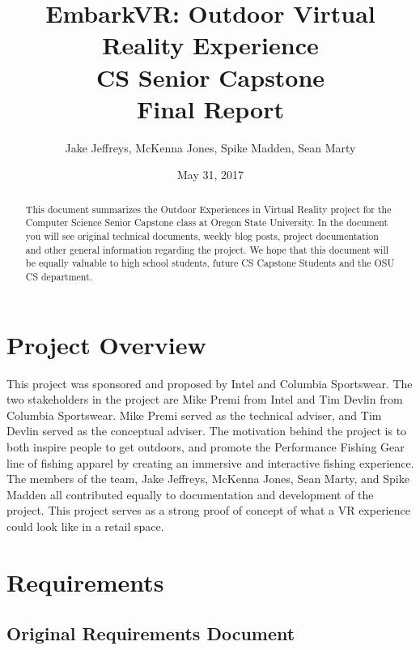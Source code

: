 \documentclass[10pt,journal,compsoc,onecolumn, draftclsnofoot]{IEEEtran}
\title{
EmbarkVR: Outdoor Virtual Reality Experience \\
CS Senior Capstone \\
Final Report\\
\vspace{1mm}
}
\author{Jake Jeffreys, McKenna Jones, Spike Madden, Sean Marty}
\date{May 31, 2017}
\begin{document}
\begin{titlepage}
\maketitle
\vspace{1mm}
\begin{abstract}
This document summarizes the Outdoor Experiences in Virtual Reality project for the Computer Science Senior Capstone class at Oregon State University. In the document you will see original technical documents, weekly blog posts, project documentation and other general information regarding the project. We hope that this document will be equally valuable to high school students, future CS Capstone Students and the OSU CS department.

\end{abstract}
\vspace{1cm}

\end{titlepage}

\tableofcontents
\clearpage

\section{Project Overview}
This project was sponsored and proposed by Intel and Columbia Sportswear. The two stakeholders in the project are Mike Premi from Intel and Tim Devlin from Columbia Sportswear. Mike Premi served as the technical adviser, and Tim Devlin served as the conceptual adviser. The motivation behind the project is to both inspire people to get outdoors, and promote the Performance Fishing Gear line of fishing apparel by creating an immersive and interactive fishing experience. The members of the team, Jake Jeffreys, McKenna Jones, Sean Marty, and Spike Madden all contributed equally to documentation and development of the project. This project serves as a strong proof of concept of what a VR experience could look like in a retail space.

\section{Requirements}
\subsection{Original Requirements Document}

\end{document}
